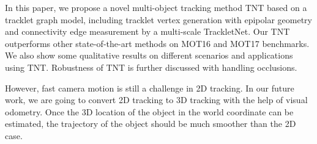 \documentclass[10pt,twocolumn,letterpaper]{article}
\begin{document}
In this paper, we propose a novel multi-object tracking method TNT based on a tracklet graph model, including tracklet vertex generation with epipolar geometry and connectivity edge measurement by a multi-scale TrackletNet. Our TNT outperforms other state-of-the-art methods on MOT16 and MOT17 benchmarks. We also show some qualitative results on different scenarios and applications using TNT. Robustness of TNT is further discussed with handling occlusions. 


However, fast camera motion is still a challenge in 2D tracking. 
In our future work, we are going to convert 2D tracking to 3D tracking with the help of visual odometry. Once the 3D location of the object in the world coordinate can be estimated, the trajectory of the object should be much smoother than the 2D case. 






{\small


}
\end{document}
